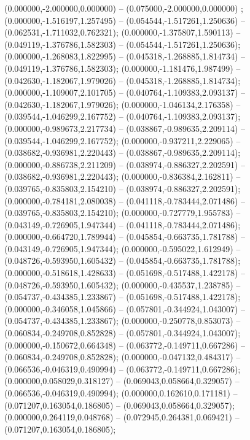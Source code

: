  (0.000000,-2.000000,0.000000) -- (0.075000,-2.000000,0.000000) ;
 (0.000000,-1.516197,1.257495) -- (0.054544,-1.517261,1.250636) -- (0.062531,-1.711032,0.762321);
 (0.000000,-1.375807,1.590113) -- (0.049119,-1.376786,1.582303) -- (0.054544,-1.517261,1.250636);
 (0.000000,-1.268083,1.822995) -- (0.045318,-1.268885,1.814734) -- (0.049119,-1.376786,1.582303);
 (0.000000,-1.181476,1.987499) -- (0.042630,-1.182067,1.979026) -- (0.045318,-1.268885,1.814734);
 (0.000000,-1.109007,2.101705) -- (0.040764,-1.109383,2.093137) -- (0.042630,-1.182067,1.979026);
 (0.000000,-1.046134,2.176358) -- (0.039544,-1.046299,2.167752) -- (0.040764,-1.109383,2.093137);
 (0.000000,-0.989673,2.217734) -- (0.038867,-0.989635,2.209114) -- (0.039544,-1.046299,2.167752);
 (0.000000,-0.937211,2.229065) -- (0.038682,-0.936981,2.220443) -- (0.038867,-0.989635,2.209114);
 (0.000000,-0.886738,2.211209) -- (0.038974,-0.886327,2.202591) -- (0.038682,-0.936981,2.220443);
 (0.000000,-0.836384,2.162811) -- (0.039765,-0.835803,2.154210) -- (0.038974,-0.886327,2.202591);
 (0.000000,-0.784181,2.080038) -- (0.041118,-0.783444,2.071486) -- (0.039765,-0.835803,2.154210);
 (0.000000,-0.727779,1.955783) -- (0.043149,-0.726905,1.947344) -- (0.041118,-0.783444,2.071486);
 (0.000000,-0.664720,1.789944) -- (0.045854,-0.663735,1.781788) -- (0.043149,-0.726905,1.947344);
 (0.000000,-0.595022,1.612949) -- (0.048726,-0.593950,1.605432) -- (0.045854,-0.663735,1.781788);
 (0.000000,-0.518618,1.428633) -- (0.051698,-0.517488,1.422178) -- (0.048726,-0.593950,1.605432);
 (0.000000,-0.435537,1.238785) -- (0.054737,-0.434385,1.233867) -- (0.051698,-0.517488,1.422178);
 (0.000000,-0.346058,1.045866) -- (0.057801,-0.344924,1.043007) -- (0.054737,-0.434385,1.233867);
 (0.000000,-0.250778,0.853073) -- (0.060834,-0.249708,0.852828) -- (0.057801,-0.344924,1.043007);
 (0.000000,-0.150672,0.664348) -- (0.063772,-0.149711,0.667286) -- (0.060834,-0.249708,0.852828);
 (0.000000,-0.047132,0.484317) -- (0.066536,-0.046319,0.490994) -- (0.063772,-0.149711,0.667286);
 (0.000000,0.058029,0.318127) -- (0.069043,0.058664,0.329057) -- (0.066536,-0.046319,0.490994);
 (0.000000,0.162610,0.171181) -- (0.071207,0.163054,0.186805) -- (0.069043,0.058664,0.329057);
 (0.000000,0.264119,0.048768) -- (0.072945,0.264381,0.069421) -- (0.071207,0.163054,0.186805);

